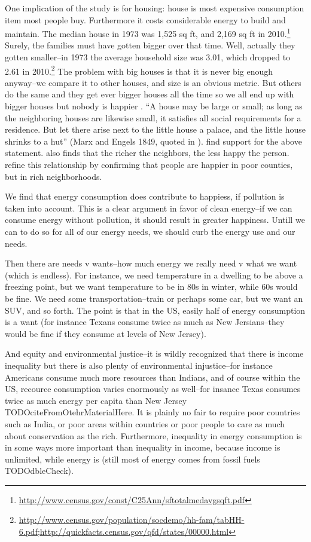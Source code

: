\documentclass[10pt, letterpaper]{article}
\begin{document}
\begin{spacing}{1.4}
One implication of the study is for housing: house is most expensive consumption
item most people buy. Furthermore it costs considerable energy to build and
maintain. The median house in 1973 was 1,525 sq ft, and 2,169  sq ft in 2010.\footnote{\url{http://www.census.gov/const/C25Ann/sftotalmedavgsqft.pdf}}
Surely, the families must have gotten bigger over that time. Well,
actually they gotten smaller--in 1973 the average household size was
3.01, which dropped to 2.61 in
2010.\footnote{\url{http://www.census.gov/population/socdemo/hh-fam/tabHH-6.pdf};\url{http://quickfacts.census.gov/qfd/states/00000.html}}
The problem with big houses is that it is never big enough anyway--we
compare it to other houses, and size is an obvious metric. But others
do the same and they get ever bigger houses all the time so we all end
up with bigger houses but nobody is happier \citep{frank12}. ``A house may be large or small; as long as the neighboring houses are
likewise small, it satisfies all social requirements for a
residence. But let there arise next to the little house a palace, and
the little house shrinks to a hut'' (Marx and Engels 1849, quoted in
\citet{dittmann10}). \citet{dittmann10} find support for the above
statement. \citet{luttmer05} also finds that the richer the neighbors,
the less happy the person.
\citet{firebaugh09} refine this relationship by confirming that people
are happier in poor counties, but in  rich neighborhoods. 

We find that energy consumption does contribute to happiess, if pollution is
taken into account. This is a clear argument in favor of clean energy--if we can
consume energy without pollution, it should result in greater happiness. Untill
we can to do so for all of our energy needs, we should curb the energy use and
our needs.

Then there are needs v wants--how much energy we really need v what we want
(which is endless). For instance, we need temperature in a dwelling to be above
a freezing point, but we want temperature to be in 80s in winter, while 60s
would be fine. We need some transportation--train or perhaps some car, but we
want an SUV, and so forth. The point is that in the US, easily half of energy
consumption is a want (for instance Texans consume twice as much as New
Jersians--they would be fine if they consume at levels of New Jersey).%

 And equity and environmental justice--it is wildly
recognized that there is income inequality \citep[e.g.,]{piketty14} but there is
 also plenty of environmental injustice--for instance Americans consume much
 more resources than Indians, and of course within the US, recource consumption
 varies enormously as well--for insance Texas consumes twice as much energy per
 capita than New Jersey TODOciteFromOtehrMaterialHere. It is plainly no fair to
 require poor countries such as India, or poor areas within countries or poor
 people to care as much about conservation as the rich.
 Furthermore, inequality in energy
 consumption is in some ways more important than inequality in income, because
 income is unlimited, while energy is (still most of energy comes from fossil
 fuels TODOdbleCheck).  %



\end{spacing}
\end{document}
